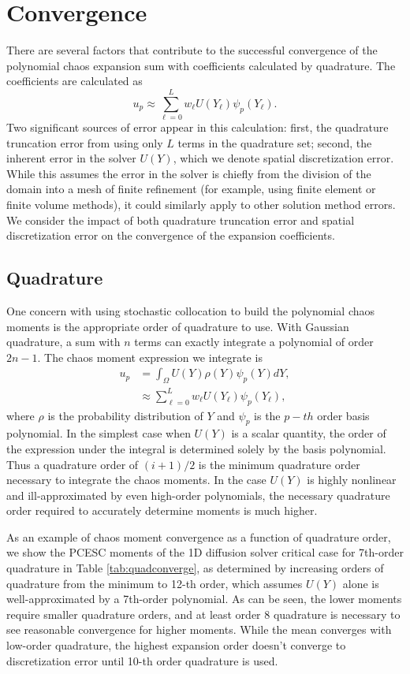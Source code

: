 \section{Convergence}
There are several factors that contribute to the successful convergence of the polynomial chaos expansion sum with coefficients calculated by quadrature.  The coefficients are calculated as
\begin{equation}
u_p \approx \sum_{\ell=0}^{L} w_\ell U(Y_\ell) \psi_p(Y_\ell).
\end{equation}
Two significant sources of error appear in this calculation: first, the quadrature truncation error from using only $L$ terms in the quadrature set; second, the inherent error in the solver $U(Y)$, which we denote spatial discretization error.  While this assumes the error in the solver is chiefly from the division of the domain into a mesh of finite refinement (for example, using finite element or finite volume methods), it could similarly apply to other solution method errors.
We consider the impact of both quadrature truncation error and spatial discretization error on the convergence of the expansion coefficients.

\subsection{Quadrature}\label{sec:quadconv}
One concern with using stochastic collocation to build the polynomial chaos moments is the appropriate order of quadrature to use.  With Gaussian quadrature, a sum with $n$ terms can exactly integrate a polynomial of order $2n-1$.  The chaos moment expression we integrate is
\begin{align}
u_p &= \int_\Omega U(Y)\rho(Y)\psi_p(Y)dY,\\
  &\approx \sum_{\ell=0}^L w_\ell U(Y_\ell)\psi_p(Y_\ell),
\end{align}
where $\rho$ is the probability distribution of $Y$ and $\psi_p$ is the $p-th$ order basis polynomial.  In the simplest case when $U(Y)$ is a scalar quantity, the order of the expression under the integral is determined solely by the basis polynomial.  Thus a quadrature order of $(i+1)/2$ is the minimum quadrature order necessary to integrate the chaos moments.  In the case $U(Y)$ is highly nonlinear and ill-approximated by even high-order polynomials, the necessary quadrature order required to accurately determine moments is much higher.

As an example of chaos moment convergence as a function of quadrature order, we show the PCESC moments of the 1D diffusion solver critical case for 7th-order quadrature in Table \ref{tab:quadconverge}, as determined by increasing orders of quadrature from the minimum to 12-th order, which assumes $U(Y)$ alone is well-approximated by a 7th-order polynomial.  As can be seen, the lower moments require smaller quadrature orders, and at least order 8 quadrature is necessary to see reasonable convergence for higher moments.  While the mean converges with low-order quadrature, the highest expansion order doesn't converge to discretization error until 10-th order quadrature is used.

